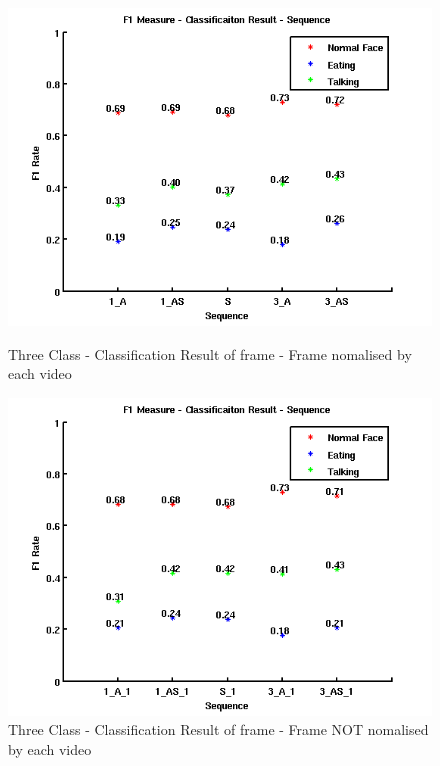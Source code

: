 \begin{figure}[ht]
\centering
\begin{minipage}{.5\textwidth}
  \centering
  \captionsetup{justification=centering,margin=1cm}
  \includegraphics[width=\linewidth]{imgs/Result_F1_Sequence.png}
  \caption{Three Class - Classification Result of frame - Frame nomalised by each video}
  \label{fig:RFS}
\end{minipage}%
\begin{minipage}{.5\textwidth}
  \centering
  \captionsetup{justification=centering,margin=1cm}
  \includegraphics[width=\linewidth]{imgs/Result_F1_Sequence_1.png}
  \caption{Three Class - Classification Result of frame - Frame NOT nomalised by each video}
  \label{fig:RFS1}
\end{minipage}
\end{figure}
